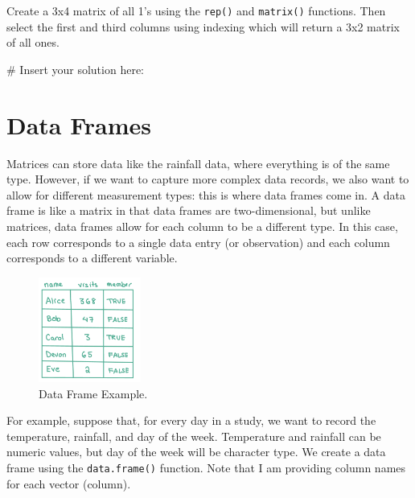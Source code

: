\documentclass[
  letterpaper,
]{krantz}
\makeatletter
\newenvironment{Shaded}{\begin{snugshade}}{\end{snugshade}}
\newcommand{\CommentTok}[1]{\textcolor[rgb]{0.37,0.37,0.37}{#1}}
\newenvironment{kframe}{%
\medskip{}
\setlength{\fboxsep}{.8em}
 \def\at@end@of@kframe{}%
 \ifinner\ifhmode%
  \def\at@end@of@kframe{\end{minipage}}%
  \begin{minipage}{\columnwidth}%
 \fi\fi%
 \def\FrameCommand##1{\hskip\@totalleftmargin \hskip-\fboxsep
 \colorbox{shadecolor}{##1}\hskip-\fboxsep
     \hskip-\linewidth \hskip-\@totalleftmargin \hskip\columnwidth}%
 \MakeFramed {\advance\hsize-\width
   \@totalleftmargin\z@ \linewidth\hsize
   \@setminipage}}%
 {\par\unskip\endMakeFramed%
 \at@end@of@kframe}
\renewenvironment{Shaded}{\begin{kframe}}{\end{kframe}}
\makeatother
\begin{document}
Create a 3x4 matrix of all 1's using the \texttt{rep()} and
\texttt{matrix()} functions. Then select the first and third columns
using indexing which will return a 3x2 matrix of all ones.

\begin{Shaded}
\begin{Highlighting}[]
\CommentTok{\# Insert your solution here:}
\end{Highlighting}
\end{Shaded}

\hypertarget{data-frames}{%
\section{Data Frames}\label{data-frames}}

Matrices can store data like the rainfall data, where everything is of
the same type. However, if we want to capture more complex data records,
we also want to allow for different measurement types: this is where
data frames come in. A data frame is like a matrix in that data frames
are two-dimensional, but unlike matrices, data frames allow for each
column to be a different type. In this case, each row corresponds to a
single data entry (or observation) and each column corresponds to a
different variable.

\begin{figure}

{\centering \includegraphics[width=0.3\textwidth,height=\textheight]{book/images/2-dataframe.png}

}

\caption{\label{fig-dataframe}Data Frame Example.}

\end{figure}

For example, suppose that, for every day in a study, we want to record
the temperature, rainfall, and day of the week. Temperature and rainfall
can be numeric values, but day of the week will be character type. We
create a data frame using the \texttt{data.frame()} function. Note that
I am providing column names for each vector (column).
\end{document}
